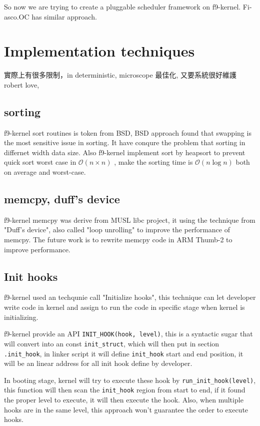 \documentclass[10pt,preprint,nocopyrightspace]{sigplanconf}
\begin{document}
So now we are trying to create a pluggable scheduler framework on f9-kernel.  Fi-asco.OC has similar approach\cite{elphinstone2013l3,fiasco}.

\section{Implementation techniques}

實際上有很多限制，in deterministic, microscope 最佳化, 又要系統很好維護
robert love, 

\subsection{sorting}
f9-kernel sort routines is token from BSD\cite{bentley1993engineering}, BSD approach found that swapping is the most sensitive issue in sorting. It have conqure the problem that sorting in differnet width data size. Also f9-kernel implement sort by heapsort to prevent quick sort worst case in $\mathcal{O}(n \times n)$ , make the sorting time is $\mathcal{O}(n\log{}n)$  both on average and worst-case.

\subsection{memcpy, duff's device}
f9-kernel memcpy was derive from MUSL libc project\cite{felker}, it using the technique from "Duff's device", also called "loop unrolling" to improve the performance of memcpy. The future work is to rewrite memcpy code in ARM Thumb-2 to improve performance.

\subsection{Init hooks}

f9-kernel used an techqunie call "Initialize hooks", this technique can let developer write code in kernel and assign to run the code in specific stage when kernel is initializing.

f9-kernel provide an API \verb|INIT_HOOK(hook, level)|, this is a syntactic sugar that will convert into an const \verb|init_struct|, which will then put in section \verb|.init_hook|, in linker script it will define \verb|init_hook| start and end position, it will be an linear address for all init hook define by developer.

In booting stage, kernel will try to execute these hook by \verb|run_init_hook(level)|, this function will then scan the \verb|init_hook| region from start to end, if it found the proper level to execute, it will then execute the hook. Also, when multiple hooks are in the same level, this approach won't guarantee the order to execute hooks.
\end{document}
